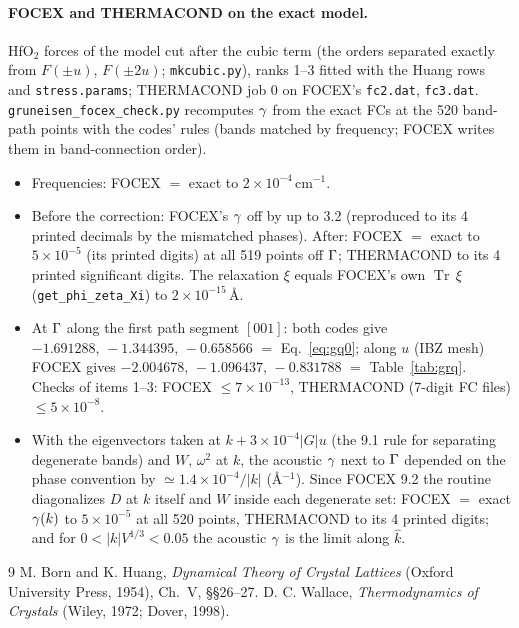 \documentclass[11pt,a4paper]{article}
\newcommand{\Tr}{\operatorname{Tr}}
\begin{document}
\paragraph{FOCEX and THERMACOND on the exact model.} HfO$_2$ forces of the model cut after the cubic term
(the orders separated exactly from $F(\pm u)$, $F(\pm2u)$; \texttt{mkcubic.py}), ranks 1--3 fitted with the
Huang rows and \texttt{stress.params}; THERMACOND job 0 on FOCEX's \texttt{fc2.dat}, \texttt{fc3.dat}.
\texttt{gruneisen\_focex\_check.py} recomputes $\gamma$ from the exact FCs at the 520 band-path points with the
codes' rules (bands matched by frequency; FOCEX writes them in band-connection order).
\begin{itemize}
\item Frequencies: FOCEX $=$ exact to $2\times10^{-4}$\,cm$^{-1}$.
\item Before the correction: FOCEX's $\gamma$ off by up to 3.2 (reproduced to its 4 printed decimals by the
  mismatched phases). After: FOCEX $=$ exact to $5\times10^{-5}$ (its printed digits) at all 519 points
  off $\Gamma$; THERMACOND to its 4 printed significant digits. The relaxation $\xi$ equals FOCEX's own
  $\Tr\,\xi$ (\texttt{get\_phi\_zeta\_Xi}) to $2\times10^{-15}$\,\AA.
\item At $\Gamma$ along the first path segment $[001]$: both codes give $-1.691288,\,-1.344395,\,-0.658566$
  $=$ Eq.~\eqref{eq:gq0}; along $u$ (IBZ mesh) FOCEX gives $-2.004678,\,-1.096437,\,-0.831788$ $=$
  Table~\ref{tab:grq}. Checks of items 1--3: FOCEX $\le7\times10^{-13}$, THERMACOND (7-digit FC files)
  $\le5\times10^{-8}$.
\item With the eigenvectors taken at $k+3\times10^{-4}|G|u$ (the 9.1 rule for separating degenerate bands) and
  $W$, $\omega^2$ at $k$, the acoustic $\gamma$ next to $\Gamma$ depended on the phase convention by
  $\simeq1.4\times10^{-4}/|k|$ (\AA$^{-1}$). Since FOCEX 9.2 the routine diagonalizes $D$ at $k$ itself and $W$
  inside each degenerate set: FOCEX $=$ exact $\gamma(k)$ to $5\times10^{-5}$ at all 520 points, THERMACOND to its
  4 printed digits; and for $0<|k|V^{1/3}<0.05$ the acoustic $\gamma$ is the limit along $\hat k$.
\end{itemize}

\begin{thebibliography}{9}
 M. Born and K. Huang, \emph{Dynamical Theory of Crystal Lattices}
  (Oxford University Press, 1954), Ch.~V, \S\S 26--27.
 D. C. Wallace, \emph{Thermodynamics of Crystals} (Wiley, 1972; Dover, 1998).
\end{thebibliography}
\end{document}
